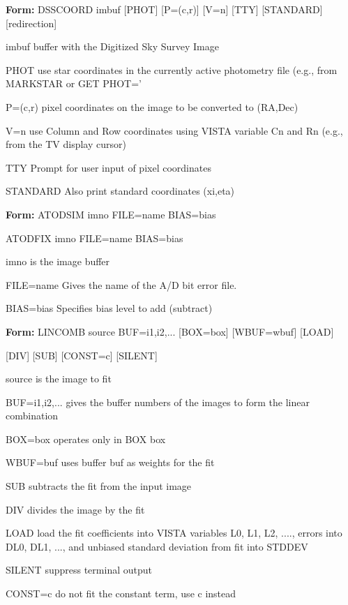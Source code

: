 {\newpage\clearpage
{}%
\begin{command}
  \item[\textbf{Form: } DSSCOORD imbuf {[PHOT]} {[P=(c,r)]} {[V=n]} {[TTY]} 
       {[STANDARD]} {[redirection]}\hfill]{}
  \item[imbuf]{buffer with the Digitized Sky Survey Image}
  \item[PHOT]{use star coordinates in the currently active
       photometry file (e.g., from MARKSTAR or GET PHOT='}
  \item[P=(c,r)]{pixel coordinates on the image to be converted to
       (RA,Dec)}
  \item[V=n]{use Column and Row coordinates using VISTA variable
       Cn and Rn (e.g., from the TV display cursor)}
  \item[TTY]{Prompt for user input of pixel coordinates}
  \item[STANDARD]{Also print standard coordinates (xi,eta)}
\end{command}%
\lthtmlfigureZ
\lthtmlcheckvsize\clearpage}

{\newpage\clearpage
{}%
\begin{command}
  \item[\textbf{Form: }ATODSIM imno FILE=name BIAS=bias\hfill]{}
  \item[ATODFIX imno FILE=name BIAS=bias\hfill]{}
  \item[imno]{is the image buffer}
  \item[FILE=name]{Gives the name of the A/D bit error file.}
  \item[BIAS=bias]{Specifies bias level to add (subtract)}
\end{command}%
\lthtmlfigureZ
\lthtmlcheckvsize\clearpage}

{\newpage\clearpage
{}%
\begin{command}
  \item[\textbf{Form: } LINCOMB source BUF=i1,i2,... {[BOX=box]} 
       {[WBUF=wbuf]} {[LOAD]}\hfill]{}
  \item{{[DIV]} {[SUB]} {[CONST=c]} {[SILENT]}}
  \item[source]{is the image to fit}
  \item[BUF=i1,i2,...]{gives the buffer numbers of the images to form
       the linear combination}
  \item[BOX=box]{operates only in BOX box}
  \item[WBUF=buf]{uses buffer buf as weights for the fit}
  \item[SUB]{subtracts the fit from the input image}
  \item[DIV]{divides the image by the fit}
  \item[LOAD]{load the fit coefficients into VISTA variables
       L0, L1, L2, ...., errors into DL0, DL1, ..., and
       unbiased standard deviation from fit into STDDEV}
  \item[SILENT]{suppress terminal output}
  \item[CONST=c]{do not fit the constant term, use c instead}
\end{command}%
\lthtmlfigureZ
\lthtmlcheckvsize\clearpage}

